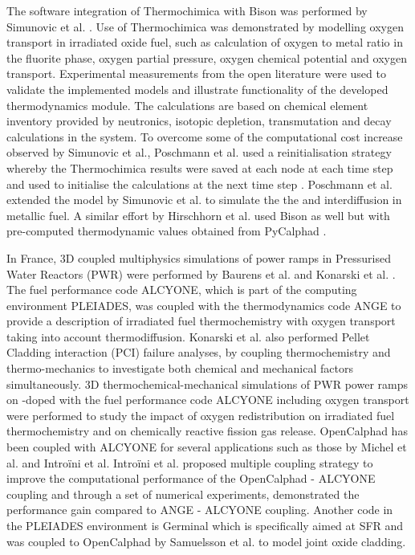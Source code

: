 	The software integration of Thermochimica with Bison was performed by Simunovic et al. \cite{Simunovic:2020aa}. Use of Thermochimica was demonstrated by modelling oxygen transport in irradiated  oxide fuel, such as calculation of oxygen to metal ratio in the fluorite phase, oxygen partial pressure, oxygen chemical potential and oxygen transport. Experimental measurements from the open literature were used to validate the implemented models and illustrate functionality of the developed thermodynamics module. The calculations are based on chemical element inventory provided by neutronics, isotopic depletion, transmutation and decay calculations in the \cite{SCALE05} system. To overcome some of the computational cost increase observed by Simunovic et al., Poschmann et al. used a reinitialisation strategy whereby the Thermochimica results were saved at each node at each time step and used to initialise the calculations at the next time step \cite{Poschmann:2019aa}. Poschmann et al. \cite{Poschmann:2021aa} extended the model by  Simunovic et al. to simulate the the  and  interdiffusion in  metallic fuel. A similar effort by Hirschhorn et al. used Bison as well but with pre-computed thermodynamic values obtained from PyCalphad \cite{Hirschhorn:2021aa}. 

	In France, 3D coupled multiphysics simulations of power ramps in Pressurised Water Reactors (PWR) were performed by Baurens et al. \cite{Baurens:2014aa} and  Konarski et al. \cite{KONARSKI2019104}. The fuel performance code {ALCYONE}, which is part of the computing environment {PLEIADES}, was coupled with the thermodynamics code {ANGE} to provide a description of irradiated fuel thermochemistry with oxygen transport taking into account thermodiffusion. Konarski et al. also performed Pellet Cladding interaction (PCI) failure analyses, by coupling thermochemistry and thermo-mechanics to investigate both chemical and mechanical factors simultaneously. 3D thermochemical-mechanical simulations of PWR power ramps on -doped  with the fuel performance code {ALCYONE} including oxygen transport were performed to study the impact of oxygen redistribution on irradiated fuel thermochemistry and on chemically reactive fission gas release. OpenCalphad has been coupled with ALCYONE for several applications such as those by Michel et al. \cite{Michel:2013aa} and Intro\"{i}ni et al. Intro\"{i}ni et al. proposed multiple coupling strategy to improve the computational performance of the OpenCalphad - ALCYONE coupling and through a set of numerical experiments, demonstrated the performance gain compared to ANGE - ALCYONE coupling. Another code in the PLEIADES environment is Germinal which is specifically aimed at SFR and was coupled to OpenCalphad by Samuelsson et al. \cite{Samuelsson-Karl:2020aa} to model joint oxide cladding.
	
